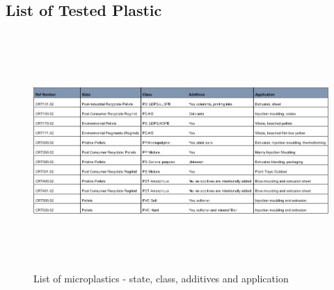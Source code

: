 \begin{appendices}
\chapter{List of Tested Plastic}
\label{app:list_plast}

\begin{figure}
    \centering
    \includegraphics[height = 9cm, angle = 90]{Images/order.png}
    \caption{List of microplastics - state, class, additives and application}
    \label{fig:order}
\end{figure}


\end{appendices}
